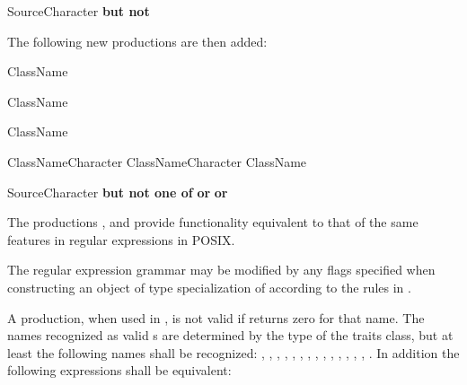 \begin{ncrebnf}
\br
  SourceCharacter \textnormal{\textbf{but not}} 
\end{ncrebnf}

\pnum
The following new productions are then added:

\begin{ncrebnf}
\br
  \terminal{[:} ClassName \terminal{:]}
\end{ncrebnf}

\begin{ncrebnf}
\br
  \terminal{[.} ClassName \terminal{.]}
\end{ncrebnf}

\begin{ncrebnf}
\br
  \terminal{[=} ClassName \terminal{=]}
\end{ncrebnf}

\begin{ncrebnf}
\br
  ClassNameCharacter\br
  ClassNameCharacter ClassName
\end{ncrebnf}

\begin{ncrebnf}
\br
  SourceCharacter \textnormal{\textbf{but not one of}}  \textnormal{\textbf{or}} \terminal{=} \textnormal{\textbf{or}} \terminal{:}
\end{ncrebnf}

\pnum
The productions , 
and  provide functionality
equivalent to that of the same features in regular expressions in POSIX.

\pnum
The regular expression grammar may be modified by
any  flags specified when
constructing an object of type specialization of 
according to the rules in .

\pnum
A  production, when used in ,
is not valid if  returns zero for
that name.  The names recognized as valid s are
determined by the type of the traits class, but at least the following
names shall be recognized:
, , , , ,
, , , , ,
, , , , .
In addition the following expressions shall be equivalent:

